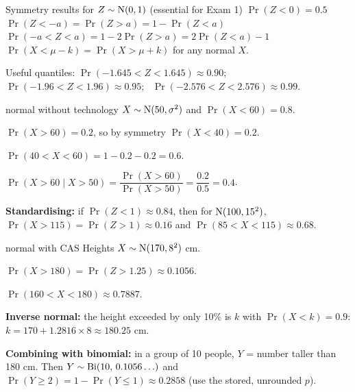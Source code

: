 \begin{cols}[0.53]
\end{cols}

\begin{keyres}{Symmetry results for $Z\sim\mathrm{N}(0,1)$ (essential for Exam 1)}
$\Pr(Z<0)=0.5$ \textbullet\ $\Pr(Z<-a)=\Pr(Z>a)=1-\Pr(Z<a)$ \textbullet\ $\Pr(-a<Z<a)=1-2\Pr(Z>a)=2\Pr(Z<a)-1$ \textbullet\ $\Pr(X<\mu-k)=\Pr(X>\mu+k)$ for any normal $X$.\par
Useful quantiles: $\Pr(-1.645<Z<1.645)\approx0.90$; \ $\Pr(-1.96<Z<1.96)\approx0.95$; \ $\Pr(-2.576<Z<2.576)\approx0.99$.
\end{keyres}

\begin{cols}
\begin{example}{normal without technology \byhand}
$X\sim\mathrm{N}(50,\sigma^2)$ and $\Pr(X<60)=0.8$.\par
$\Pr(X>60)=0.2$, so by symmetry $\Pr(X<40)=0.2$.\par
$\Pr(40<X<60)=1-0.2-0.2=0.6$.\par
$\Pr(X>60\mid X>50)=\dfrac{\Pr(X>60)}{\Pr(X>50)}=\dfrac{0.2}{0.5}=0.4$.\par
\textbf{Standardising:} if $\Pr(Z<1)\approx0.84$, then for $\mathrm{N}(100,15^2)$, $\Pr(X>115)=\Pr(Z>1)\approx0.16$ and $\Pr(85<X<115)\approx0.68$.
\end{example}
\nextcol
\begin{example}{normal with CAS \examtwo}
Heights $X\sim\mathrm{N}(170,8^2)$ cm.\par
$\Pr(X>180)=\Pr(Z>1.25)\approx0.1056$.\par
$\Pr(160<X<180)\approx0.7887$.\par
\textbf{Inverse normal:} the height exceeded by only 10\% is $k$ with $\Pr(X<k)=0.9$: $k=170+1.2816\times8\approx180.25$ cm.\par
\textbf{Combining with binomial:} in a group of 10 people, $Y$ = number taller than 180 cm. Then $Y\sim\mathrm{Bi}(10,\,0.1056\ldots)$ and $\Pr(Y\ge2)=1-\Pr(Y\le1)\approx0.2858$ (use the stored, unrounded $p$).
\end{example}
\end{cols}

